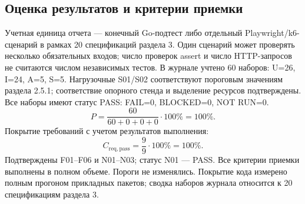 \documentclass[12pt,a4paper]{extarticle}
\begin{document}
\subsection{Оценка результатов и критерии приемки}
Учетная единица отчета --- конечный Go-подтест либо отдельный
Playwright/k6-сценарий в рамках 20 спецификаций раздела 3.
Один сценарий может проверять несколько обязательных входов;
число проверок assert и число HTTP-запросов не считаются числом независимых тестов.
В журнале учтено 60 наборов: U=26, I=24, A=5, S=5.
Нагрузочные S01/S02 соответствуют пороговым значениям раздела 2.5.1;
соответствие опорного стенда и выделение ресурсов подтверждены.
Все наборы имеют статус PASS: FAIL=0, BLOCKED=0, NOT RUN=0.
\[
 P=\frac{60}{60+0+0+0}\cdot100\%=100\%.
\]
Покрытие требований с учетом результатов выполнения:
\[
 C_{\mathrm{req,pass}}=\frac{9}{9}\cdot100\%=100\%.
\]
Подтверждены F01--F06 и N01--N03; статус N01 --- PASS.
Все критерии приемки выполнены в полном объеме. Пороги не изменялись.
Покрытие кода измерено полным прогоном прикладных пакетов;
сводка наборов журнала относится к 20 спецификациям раздела 3.
\end{document}
